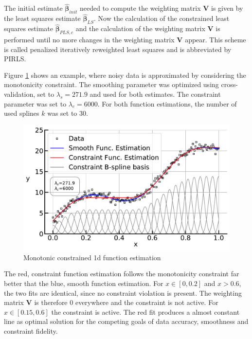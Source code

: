 \documentclass[10pt,a4paper]{article}
\begin{document}
	The initial estimate $\boldsymbol{\hat{\beta}}_{init}$ needed to compute the weighting matrix $\boldsymbol{V}$ is given by the least squares estimate $\boldsymbol{\hat{\beta}}_{LS}$. Now the calculation of the constrained least squares estimate $\boldsymbol{\hat{\beta}}_{PLS,c}$ and the calculation of the weighting matrix $\boldsymbol{V}$ is performed until no more changes in the weighting matrix $\boldsymbol{V}$ appear. This scheme is called penalized iteratively reweighted least squares and is abbreviated by PIRLS. \cite{hofner2011monotonicity}
	
	
	Figure \ref{fig:incspline} shows an example, where noisy data is approximated by considering the monotonicity constraint. The smoothing parameter was optimized using cross-validation, set to $\lambda_s=271.9$ and used for both estimates. The constraint parameter was set to $\lambda_c = 6000$. For both function estimations, the number of used splines $k$ was set to $30$. 	
	
	\begin{figure}[H]
		\centering
		\includegraphics[width=\linewidth]{../thesisplots/inc_spline.pdf}
		\caption{Monotonic constrained 1d function estimation}
		\label{fig:incspline}
	\end{figure}	

	The red, constraint function estimation follows the monotonicity constraint far better that the blue, smooth function estimation. For $x \in [0, 0.2]$ and $x > 0.6$, the two fits are identical, since no constraint violation is present. The weighting matrix $\boldsymbol{V}$ is therefore $0$ everywhere and the constraint is not active. For $x \in [0.15, 0.6]$ the constraint is active. The red fit produces a almost constant line as optimal solution for the competing goals of data accuracy, smoothness and constraint fidelity.
\end{document}
